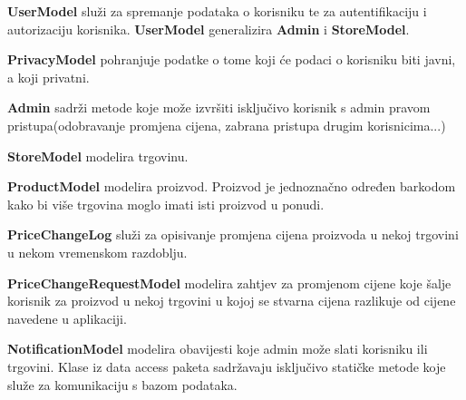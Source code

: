 			\textbf{UserModel} služi za spremanje podataka o korisniku te za autentifikaciju i autorizaciju korisnika. 
			\textbf{UserModel} generalizira \textbf{Admin} i \textbf{StoreModel}.
			 
			\textbf{PrivacyModel} pohranjuje podatke o tome koji će podaci o korisniku biti javni, a koji privatni.
			  
			\textbf{Admin} sadrži metode koje može izvršiti isključivo korisnik s admin pravom pristupa(odobravanje promjena cijena, zabrana pristupa drugim korisnicima...) 
			
			\textbf{StoreModel} modelira trgovinu. 
			
			\textbf{ProductModel} modelira proizvod. Proizvod je jednoznačno određen barkodom kako bi više trgovina moglo imati isti proizvod u ponudi. 
			
			\textbf{PriceChangeLog} služi za opisivanje promjena cijena proizvoda u nekoj trgovini u nekom vremenskom razdoblju. 
			
			\textbf{PriceChangeRequestModel} modelira zahtjev za promjenom cijene koje šalje korisnik za proizvod u nekoj trgovini u kojoj se stvarna cijena razlikuje od cijene navedene u aplikaciji.  
			
			\textbf{NotificationModel} modelira obavijesti koje admin može slati korisniku ili trgovini.
Klase iz data access paketa sadržavaju isključivo statičke metode koje služe za komunikaciju s bazom podataka.

